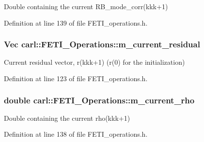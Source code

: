 Double containing the current {\ttfamily R\+B\+\_\+mode\+\_\+corr(kkk+1)} 



Definition at line 139 of file F\+E\+T\+I\+\_\+operations.\+h.

\hypertarget{classcarl_1_1_f_e_t_i___operations_a6b1154885f5b8303ecbd32ea76df40e5}{}
\subsubsection[{m\+\_\+current\+\_\+residual}]{\setlength{\rightskip}{0pt plus 5cm}Vec carl\+::\+F\+E\+T\+I\+\_\+\+Operations\+::m\+\_\+current\+\_\+residual\hspace{0.3cm}{\ttfamily [protected]}}\label{classcarl_1_1_f_e_t_i___operations_a6b1154885f5b8303ecbd32ea76df40e5}


Current residual vector, {\ttfamily r(kkk+1)} ({\ttfamily r(0)} for the initialization) 



Definition at line 123 of file F\+E\+T\+I\+\_\+operations.\+h.

\hypertarget{classcarl_1_1_f_e_t_i___operations_a1ecd729d4399772a6741c3b4bf69a69a}{}
\subsubsection[{m\+\_\+current\+\_\+rho}]{\setlength{\rightskip}{0pt plus 5cm}double carl\+::\+F\+E\+T\+I\+\_\+\+Operations\+::m\+\_\+current\+\_\+rho\hspace{0.3cm}{\ttfamily [protected]}}\label{classcarl_1_1_f_e_t_i___operations_a1ecd729d4399772a6741c3b4bf69a69a}


Double containing the current {\ttfamily rho(kkk+1)} 



Definition at line 138 of file F\+E\+T\+I\+\_\+operations.\+h.

\hypertarget{classcarl_1_1_f_e_t_i___operations_a56038a186d124078ad4b37c631f50ff0}{}
